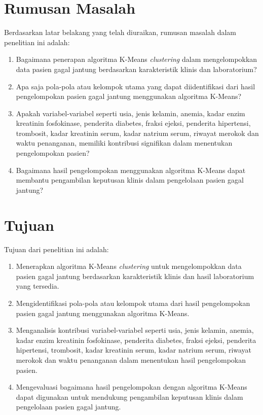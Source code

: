 \documentclass[english,12pt,a4paper,openany]{book}
\begin{document}
	\section{Rumusan Masalah}
	Berdasarkan latar belakang yang telah diuraikan, rumusan masalah dalam penelitian ini adalah:
	\begin{enumerate}
		\item Bagaimana penerapan algoritma K-Means \textit{clustering} dalam mengelompokkan data pasien gagal jantung berdasarkan karakteristik klinis dan laboratorium?  
		\item Apa saja pola-pola atau kelompok utama yang dapat diidentifikasi dari hasil pengelompokan pasien gagal jantung menggunakan algoritma K-Means?
		\item Apakah variabel-variabel seperti usia, jenis kelamin, anemia, kadar enzim kreatinin fosfokinase, penderita diabetes, fraksi ejeksi, penderita hipertensi, trombosit, kadar kreatinin serum, kadar natrium serum, riwayat merokok dan waktu penanganan, memiliki kontribusi signifikan dalam menentukan pengelompokan pasien?  
		\item Bagaimana hasil pengelompokan menggunakan algoritma K-Means dapat membantu pengambilan keputusan klinis dalam pengelolaan pasien gagal jantung?
	\end{enumerate}
	
	
	\section{Tujuan}
	Tujuan dari penelitian ini adalah:
	\begin{enumerate}
		\item Menerapkan algoritma K-Means \textit{clustering} untuk 
		mengelompokkan data pasien gagal jantung berdasarkan karakteristik klinis dan hasil laboratorium yang tersedia.
		\item Mengidentifikasi pola-pola atau kelompok utama dari hasil pengelompokan pasien gagal jantung menggunakan algoritma K-Means.
		\item Menganalisis kontribusi variabel-variabel seperti  usia, jenis kelamin, anemia, kadar enzim kreatinin fosfokinase, penderita diabetes, fraksi ejeksi, penderita hipertensi, trombosit, kadar kreatinin serum, kadar natrium serum, riwayat merokok dan waktu penanganan dalam menentukan hasil pengelompokan pasien.
		\item Mengevaluasi bagaimana hasil pengelompokan dengan algoritma K-Means dapat digunakan untuk mendukung pengambilan keputusan klinis dalam pengelolaan pasien gagal jantung.
	\end{enumerate}
\end{document}
